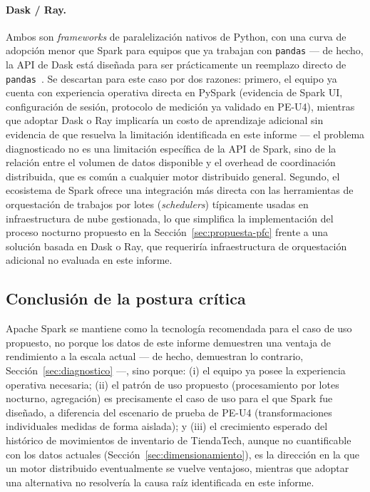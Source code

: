 \documentclass[11pt,a4paper]{article}
\begin{document}
    \paragraph{Dask / Ray.} Ambos son \emph{frameworks} de paralelización
    nativos de Python, con una curva de adopción menor que Spark para
    equipos que ya trabajan con \texttt{pandas} --- de hecho, la API de
    Dask está diseñada para ser prácticamente un reemplazo directo de
    \texttt{pandas}~\cite{grama2003}. Se descartan para este caso por dos
    razones: primero, el equipo ya cuenta con experiencia operativa
    directa en PySpark (evidencia de Spark UI, configuración de sesión,
    protocolo de medición ya validado en PE-U4), mientras que adoptar
    Dask o Ray implicaría un costo de aprendizaje adicional sin evidencia
    de que resuelva la limitación identificada en este informe --- el
    problema diagnosticado no es una limitación específica de la API de
    Spark, sino de la relación entre el volumen de datos disponible y el
    overhead de coordinación distribuida, que es común a cualquier motor
    distribuido general. Segundo, el ecosistema de Spark ofrece una
    integración más directa con las herramientas de orquestación de
    trabajos por lotes (\emph{schedulers}) típicamente usadas en
    infraestructura de nube gestionada, lo que simplifica la
    implementación del proceso nocturno propuesto en la
    Sección~\ref{sec:propuesta-pfc} frente a una solución basada en Dask
    o Ray, que requeriría infraestructura de orquestación adicional no
    evaluada en este informe.

    \subsection{Conclusión de la postura crítica}

    Apache Spark se mantiene como la tecnología recomendada para el caso
    de uso propuesto, no porque los datos de este informe demuestren una
    ventaja de rendimiento a la escala actual --- de hecho, demuestran lo
    contrario, Sección~\ref{sec:diagnostico} ---, sino porque: (i) el
    equipo ya posee la experiencia operativa necesaria; (ii) el patrón de
    uso propuesto (procesamiento por lotes nocturno, agregación) es
    precisamente el caso de uso para el que Spark fue diseñado, a
    diferencia del escenario de prueba de PE-U4 (transformaciones
    individuales medidas de forma aislada); y (iii) el crecimiento
    esperado del histórico de movimientos de inventario de TiendaTech,
    aunque no cuantificable con los datos actuales
    (Sección~\ref{sec:dimensionamiento}), es la dirección en la que un
    motor distribuido eventualmente se vuelve ventajoso, mientras que
    adoptar una alternativa no resolvería la causa raíz identificada en
    este informe.
\end{document}
